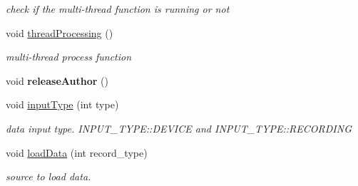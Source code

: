 \begin{DoxyCompactItemize}
\begin{DoxyCompactList}\small\item\em check if the multi-\/thread function is running or not \end{DoxyCompactList}\item 
\hypertarget{class_main_window_ad92470e70ec18f6cfe996b37f01f2c23}{}void \hyperlink{class_main_window_ad92470e70ec18f6cfe996b37f01f2c23}{thread\+Processing} ()\label{class_main_window_ad92470e70ec18f6cfe996b37f01f2c23}

\begin{DoxyCompactList}\small\item\em multi-\/thread process function \end{DoxyCompactList}\item 
\hypertarget{class_main_window_af1ac5827308c73b8a256be6e788f4d3a}{}void {\bfseries release\+Author} ()\label{class_main_window_af1ac5827308c73b8a256be6e788f4d3a}

\item 
\hypertarget{class_main_window_a62626384fc43ecfc5c402f94fc23413d}{}void \hyperlink{class_main_window_a62626384fc43ecfc5c402f94fc23413d}{input\+Type} (int type)\label{class_main_window_a62626384fc43ecfc5c402f94fc23413d}

\begin{DoxyCompactList}\small\item\em data input type. {\ttfamily I\+N\+P\+U\+T\+\_\+\+T\+Y\+P\+E\+::\+D\+E\+V\+I\+C\+E} and {\ttfamily I\+N\+P\+U\+T\+\_\+\+T\+Y\+P\+E\+::\+R\+E\+C\+O\+R\+D\+I\+N\+G} \end{DoxyCompactList}\item 
\hypertarget{class_main_window_a14991b988c3717937ed294a45b62690f}{}void \hyperlink{class_main_window_a14991b988c3717937ed294a45b62690f}{load\+Data} (int record\+\_\+type)\label{class_main_window_a14991b988c3717937ed294a45b62690f}

\begin{DoxyCompactList}\small\item\em source to load data. \end{DoxyCompactList}\end{DoxyCompactItemize}
